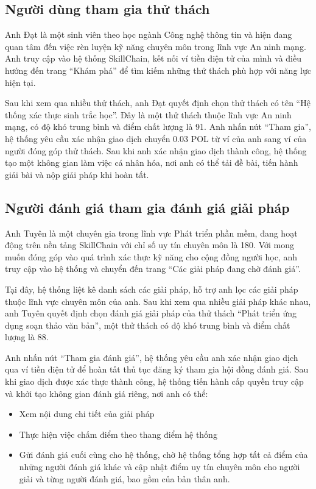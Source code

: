 \subsection{Người dùng tham gia thử thách}

Anh Đạt là một sinh viên theo học ngành Công nghệ thông tin và hiện đang quan tâm đến việc rèn luyện kỹ năng chuyên môn trong lĩnh vực An ninh mạng.
Anh truy cập vào hệ thống SkillChain, kết nối ví tiền điện tử của mình và điều hướng đến trang ``Khám phá'' để tìm kiếm những thử thách phù hợp với năng lực hiện tại.

Sau khi xem qua nhiều thử thách, anh Đạt quyết định chọn thử thách có tên ``Hệ thống xác thực sinh trắc học''. Đây là một thử thách thuộc lĩnh vực An ninh mạng, có độ khó trung bình và điểm chất lượng là 91.
Anh nhấn nút ``Tham gia'', hệ thống yêu cầu xác nhận giao dịch chuyển 0.03 POL từ ví của anh sang ví của người đóng góp thử thách.
Sau khi anh xác nhận giao dịch thành công, hệ thống tạo một không gian làm việc cá nhân hóa, nơi anh có thể tải đề bài, tiến hành giải bài và nộp giải pháp khi hoàn tất.

\subsection{Người đánh giá tham gia đánh giá giải pháp}

Anh Tuyên là một chuyên gia trong lĩnh vực Phát triển phần mềm, đang hoạt động trên nền tảng SkillChain với chỉ số uy tín chuyên môn là 180.
Với mong muốn đóng góp vào quá trình xác thực kỹ năng cho cộng đồng người học, anh truy cập vào hệ thống và chuyển đến trang ``Các giải pháp đang chờ đánh giá''.

Tại đây, hệ thống liệt kê danh sách các giải pháp, hỗ trợ anh lọc các giải pháp thuộc lĩnh vực chuyên môn của anh.
Sau khi xem qua nhiều giải pháp khác nhau, anh Tuyên quyết định chọn đánh giá giải pháp của thử thách ``Phát triển ứng dụng soạn thảo văn bản'', một thử thách có độ khó trung bình và điểm chất lượng là 88.

Anh nhấn nút ``Tham gia đánh giá'', hệ thống yêu cầu anh xác nhận giao dịch qua ví tiền điện tử để hoàn tất thủ tục đăng ký tham gia hội đồng đánh giá.
Sau khi giao dịch được xác thực thành công, hệ thống tiến hành cấp quyền truy cập và khởi tạo không gian đánh giá riêng, nơi anh có thể:

\begin{itemize}
  \item Xem nội dung chi tiết của giải pháp
  \item Thực hiện việc chấm điểm theo thang điểm hệ thống
  \item Gửi đánh giá cuối cùng cho hệ thống, chờ hệ thống tổng hợp tất cả điểm của những người đánh giá khác và cập nhật điểm uy tín chuyên môn cho người giải và từng người đánh giá, bao gồm của bản thân anh.
\end{itemize}

